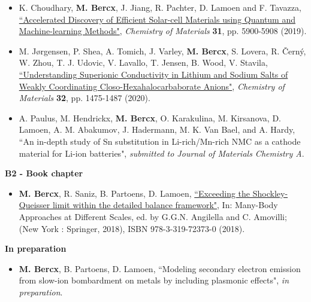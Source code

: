 \begin{itemize}
\item K. Choudhary, \textbf{M. Bercx}, J. Jiang, R. Pachter, D. Lamoen and F. Tavazza, \href{https://doi.org/10.1021/ACS.CHEMMATER.9B02166
}{``Accelerated Discovery of Efficient Solar-cell Materials using Quantum and Machine-learning Methods"}, \textit{Chemistry of Materials} \textbf{31}, pp. 5900-5908 (2019). 

\item M. J{\o}rgensen, P. Shea, A. Tomich, J. Varley, \textbf{M. Bercx}, S. Lovera, R. \v{C}ern\'{y}, W. Zhou, T. J. Udovic, V. Lavallo, T. Jensen, B. Wood, V. Stavila, \href{https://pubs.acs.org/doi/10.1021/acs.chemmater.9b04383}{``Understanding Superionic Conductivity in Lithium and Sodium Salts of Weakly Coordinating Closo-Hexahalocarbaborate Anions"}, \textit{Chemistry of Materials} \textbf{32}, pp. 1475-1487 (2020).

\item A. Paulus, M. Hendrickx, \textbf{M. Bercx}, O. Karakulina, M. Kirsanova, D. Lamoen, A. M. Abakumov, J. Hadermann, M. K. Van Bael, and A. Hardy, ``An in-depth study of Sn substitution in Li-rich/Mn-rich NMC as a cathode material for Li-ion batteries", \textit{submitted to Journal of Materials Chemistry A}.

\end{itemize}

\textbf{B2 - Book chapter}

\begin{itemize}

\item \textbf{M. Bercx}, R. Saniz, B. Partoens, D. Lamoen, \href{https://link.springer.com/chapter/10.1007/978-3-319-72374-7_15}{``Exceeding the Shockley-Queisser limit within the detailed balance framework"}, In: Many-Body Approaches at Different Scales, ed. by G.G.N. Angilella and C. Amovilli; (New York : Springer, 2018), ISBN 978-3-319-72373-0 (2018).

\end{itemize}

\textbf{In preparation}

\begin{itemize}

\item \textbf{M. Bercx}, B. Partoens, D. Lamoen, ``Modeling secondary electron emission from slow-ion bombardment on metals by including plasmonic effects", \textit{in preparation}.

\end{itemize}
